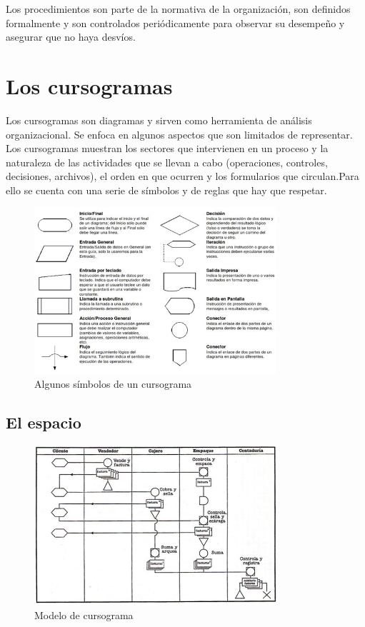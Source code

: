 \documentclass[titlepage,a4paper]{article}
\begin{document}
Los procedimientos son parte de la normativa de la organización, son definidos formalmente y son
controlados periódicamente para observar su desempeño y asegurar que no haya desvíos.

\section{Los cursogramas}
Los cursogramas son diagramas y sirven como herramienta de análisis organizacional. Se enfoca en algunos aspectos que son limitados de representar. Los cursogramas muestran los sectores que intervienen en un proceso y la naturaleza de las actividades que se llevan a cabo (operaciones, controles, decisiones, archivos), el orden en que ocurren y los formularios que circulan.Para ello se cuenta con una serie de símbolos y de reglas que hay que respetar.


\begin{figure}[!htb]
    \centering
    \includegraphics[width=0.8\textwidth]{imagenes/SimbolosCursograma.png}
    \caption{Algunos símbolos de un cursograma}
\end{figure}

\subsection*{El espacio}


\begin{figure}[!htb]
    \centering
    \includegraphics[width=0.8\textwidth]{imagenes/cursograma.jpg}
        \caption{Modelo de cursograma}
\end{figure}
\end{document}
